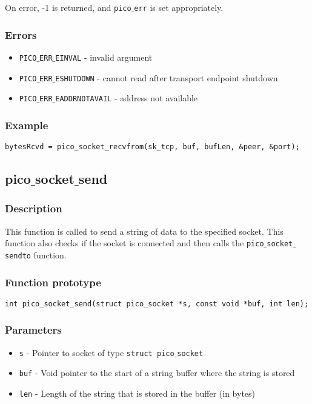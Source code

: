 On error, -1 is returned, and \texttt{pico$\_$err} is set appropriately.

\subsubsection*{Errors}
\begin{itemize}[noitemsep]
\item \texttt{PICO$\_$ERR$\_$EINVAL} - invalid argument
\item \texttt{PICO$\_$ERR$\_$ESHUTDOWN} - cannot read after transport endpoint shutdown
\item \texttt{PICO$\_$ERR$\_$EADDRNOTAVAIL} - address not available
\end{itemize}

\subsubsection*{Example}
\begin{verbatim}
bytesRcvd = pico_socket_recvfrom(sk_tcp, buf, bufLen, &peer, &port);
\end{verbatim}


\subsection{pico$\_$socket$\_$send}

\subsubsection*{Description}
This function is called to send a string of data to the specified socket.
This function also checks if the socket is connected and then calls the
\texttt{pico$\_$socket$\_$sendto} function.

\subsubsection*{Function prototype}
\begin{verbatim}
int pico_socket_send(struct pico_socket *s, const void *buf, int len);
\end{verbatim}


\subsubsection*{Parameters}
\begin{itemize}[noitemsep]
\item \texttt{s} - Pointer to socket of type \texttt{struct pico$\_$socket}
\item \texttt{buf} - Void pointer to the start of a string buffer where the string is stored
\item \texttt{len} - Length of the string that is stored in the buffer (in bytes)
\end{itemize}

